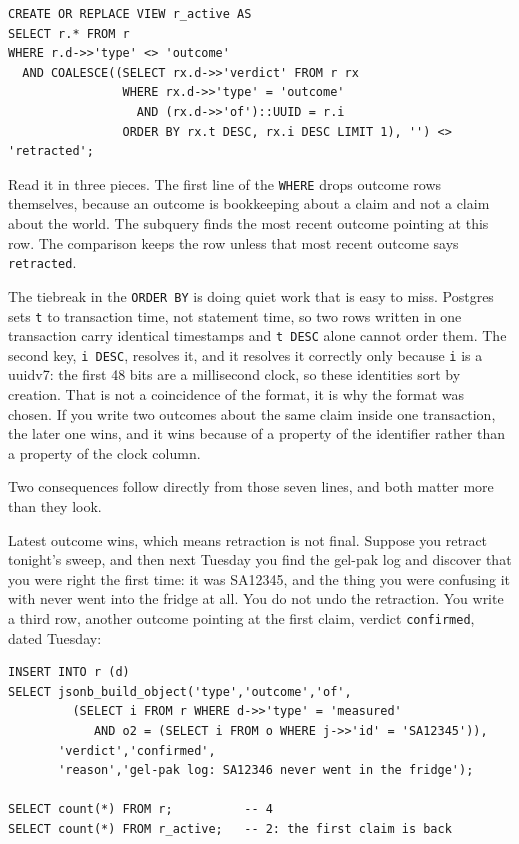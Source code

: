 \begin{verbatim}
CREATE OR REPLACE VIEW r_active AS
SELECT r.* FROM r
WHERE r.d->>'type' <> 'outcome'
  AND COALESCE((SELECT rx.d->>'verdict' FROM r rx
                WHERE rx.d->>'type' = 'outcome'
                  AND (rx.d->>'of')::UUID = r.i
                ORDER BY rx.t DESC, rx.i DESC LIMIT 1), '') <> 'retracted';
\end{verbatim}

Read it in three pieces. The first line of the \texttt{WHERE} drops outcome rows themselves, because an outcome is bookkeeping about a claim and not a claim about the world. The subquery finds the most recent outcome pointing at this row. The comparison keeps the row unless that most recent outcome says \texttt{retracted}.

The tiebreak in the \texttt{ORDER BY} is doing quiet work that is easy to miss. Postgres sets \texttt{t} to transaction time, not statement time, so two rows written in one transaction carry identical timestamps and \texttt{t DESC} alone cannot order them. The second key, \texttt{i DESC}, resolves it, and it resolves it correctly only because \texttt{i} is a uuidv7: the first 48 bits are a millisecond clock, so these identities sort by creation. That is not a coincidence of the format, it is why the format was chosen. If you write two outcomes about the same claim inside one transaction, the later one wins, and it wins because of a property of the identifier rather than a property of the clock column.

Two consequences follow directly from those seven lines, and both matter more than they look.

Latest outcome wins, which means retraction is not final. Suppose you retract tonight's sweep, and then next Tuesday you find the gel-pak log and discover that you were right the first time: it was SA12345, and the thing you were confusing it with never went into the fridge at all. You do not undo the retraction. You write a third row, another outcome pointing at the first claim, verdict \texttt{confirmed}, dated Tuesday:

\begin{verbatim}
INSERT INTO r (d)
SELECT jsonb_build_object('type','outcome','of',
         (SELECT i FROM r WHERE d->>'type' = 'measured'
            AND o2 = (SELECT i FROM o WHERE j->>'id' = 'SA12345')),
       'verdict','confirmed',
       'reason','gel-pak log: SA12346 never went in the fridge');

SELECT count(*) FROM r;          -- 4
SELECT count(*) FROM r_active;   -- 2: the first claim is back
\end{verbatim}

